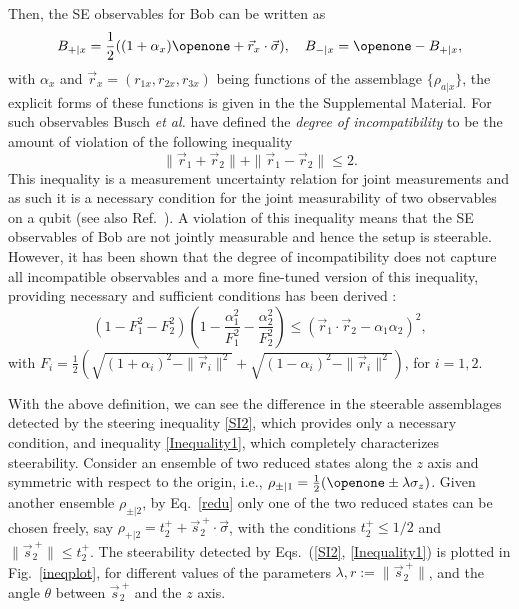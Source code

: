 \documentclass[10pt,twocolumn,aps,prl,nobibnotes,showpacs,superscriptaddress,floatfix]{revtex4-1}
\theoremstyle{definition}
\begin{document}
Then, the SE observables for Bob can be written as
\begin{eqnarray}\label{Bobobsqubit}
B_{+|x}=\frac{1}{2}((1+\alpha_x)\openone+\vec r_x\cdot\vec\sigma),\quad B_{-|x}=\openone - B_{+|x},
\end{eqnarray}
with $\alpha_x$ and $\vec r_x=(r_{1x},r_{2x},r_{3x})$ being functions of the assemblage $\{\rho_{a|x}\}$, the explicit forms of these functions is given in the the Supplemental Material. For such observables Busch {\it et al.} \cite{BLW14} have defined the {\it degree of incompatibility} to be the amount of violation of the following inequality
\begin{equation}\label{SI2}
\|\vec r_1 +\vec r_2\|+\|\vec r_1 -\vec r_2\|\leq 2.
\end{equation}
This inequality is a measurement uncertainty relation for joint measurements and as such it is a necessary condition for the joint measurability of two  observables on a qubit (see also Ref.~\cite{Busch86}). A violation of this inequality means that the SE observables of Bob are not jointly measurable and hence the setup is steerable. However, it has been shown that the degree of incompatibility does not capture all incompatible observables and a more fine-tuned version of this inequality, providing necessary and sufficient conditions has been derived \cite{YLO14}:
\begin{equation}\label{Inequality1}
(1-F_1^2-F_2^2)\left(1-\frac{\alpha_1^2}{F_1^2}-\frac{\alpha_2^2}{F_2^2}\right)\leq(\vec r_1\cdot\vec r_2-\alpha_1\alpha_2)^2, 
\end{equation}
with ${F_i=\frac{1}{2}(\sqrt{(1+\alpha_i)^2-\|\vec r_i\|^2}+\sqrt{(1-\alpha_i)^2-\|\vec r_i\|^2})}$, for $i=1,2$.

With the above definition, we can see the difference in the steerable assemblages detected by the steering inequality \eqref{SI2}, which provides only a necessary condition, and inequality  \eqref{Inequality1}, which completely characterizes steerability. Consider an ensemble of two reduced states along the $z$ axis and symmetric with respect to the origin, i.e., $\rho_{\pm|1}=\frac{1}{2}( \openone \pm \lambda \sigma_z)$. Given another ensemble $\rho_{\pm|2}$, by Eq.~\eqref{redu} only one of the two reduced states can be chosen freely, say $\rho_{+|2}=t_2^+ + \vec{s}_2^{\ +}\cdot\vec{\sigma}$, with the conditions $t_2^+\leq 1/2$ and $\|\vec{s}_2^{\ +}\|\leq t_2^+$. The steerability detected by Eqs.~(\ref{SI2}, \ref{Inequality1}) is plotted in Fig.~\ref{ineqplot}, for different values of the parameters $\lambda, r:=\|\vec{s}_2^{\ +}\|$, and the angle $\theta$ between $\vec{s}_2^{\ +}$ and the $z$ axis.
\end{document}
